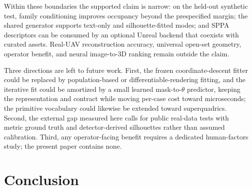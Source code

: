 \documentclass[11pt,a4paper]{article}
\begin{document}
Within these boundaries the supported claim is narrow: on the held-out
synthetic test, family conditioning improves occupancy beyond the
prespecified margin; the shared generator supports text-only and
silhouette-fitted modes; and SPPA descriptors can be consumed by an optional
Unreal backend that coexists with curated assets. Real-UAV reconstruction
accuracy, universal open-set geometry, operator benefit, and neural
image-to-3D ranking remain outside the claim.

Three directions are left to future work. First, the frozen coordinate-descent
fitter could be replaced by population-based or differentiable-rendering
fitting, and the iterative fit could be amortized by a small learned
mask-to-\(\theta\) predictor, keeping the representation and contract while
moving per-case cost toward microseconds; the primitive vocabulary could
likewise be extended toward superquadrics. Second, the external gap measured
here calls for public real-data tests with metric ground truth and
detector-derived silhouettes rather than assumed calibration. Third, any
operator-facing benefit requires a dedicated human-factors study; the present
paper contains none.

\section{Conclusion}
\end{document}
